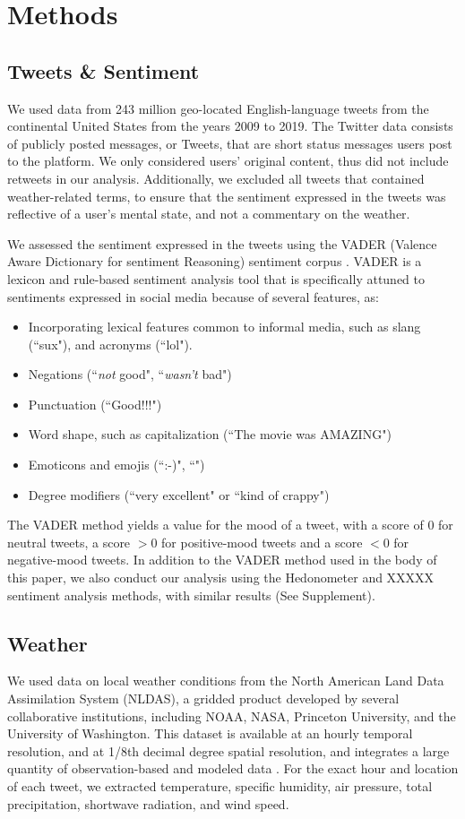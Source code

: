 \documentclass[fleqn,10pt]{wlscirep}
\begin{document}
\section*{Methods}
\subsection*{Tweets \& Sentiment}
We used data from 243 million geo-located English-language tweets from the continental United States from the years 2009 to 2019.  The Twitter data consists of publicly posted messages, or Tweets, that are short status messages users post to the platform.  We only considered users’ original content, thus did not include retweets in our analysis.  Additionally, we excluded all tweets that contained weather-related terms, to ensure that the sentiment expressed in the tweets was reflective of a user's mental state, and not a commentary on the weather.

We assessed the sentiment expressed in the tweets using the VADER (Valence Aware Dictionary for sentiment Reasoning) sentiment corpus \cite{gilbert_vader_2014}. VADER is a lexicon and rule-based sentiment analysis tool that is specifically attuned to sentiments expressed in social media because of several features, as:

\begin{itemize}
  \item Incorporating lexical features common to informal media, such as slang (``sux"), and acronyms (``lol").
  \item Negations (``\textit{not} good", ``\textit{wasn't} bad")
  \item Punctuation (``Good!!!")
  \item Word shape, such as capitalization (``The movie was AMAZING")
  \item Emoticons and emojis (``:-)", ``\emojismile")
  \item Degree modifiers (``very excellent" or ``kind of crappy")
\end{itemize} 

The VADER method yields a value for the mood of a tweet, with a score of 0 for neutral tweets, a score $> 0$ for positive-mood tweets and a score $< 0$ for negative-mood tweets.  In addition to the VADER method used in the body of this paper, we also conduct our analysis using the Hedonometer and XXXXX sentiment analysis methods, with similar results (See Supplement).

\subsection*{Weather}
We used data on local weather conditions from the North American Land Data Assimilation System (NLDAS), a gridded product developed by several collaborative institutions, including NOAA, NASA, Princeton University, and the University of Washington.  This dataset is available at an hourly temporal resolution, and at 1/8th decimal degree spatial resolution, and integrates a large quantity of observation-based and modeled data  \cite{xia_continental-scale_2012}.  For the exact hour and location of each tweet, we extracted temperature, specific humidity, air pressure, total precipitation, shortwave radiation, and wind speed.  
\end{document}
